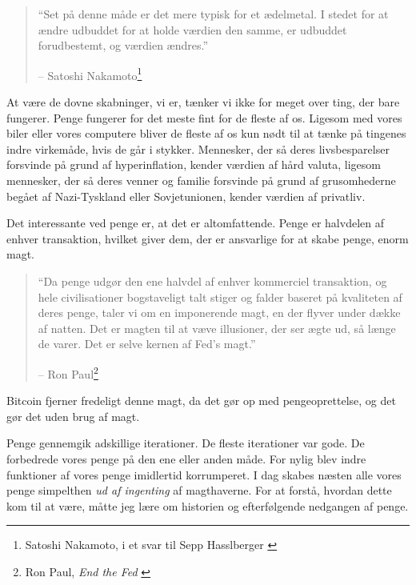 \begin{quotation}\begin{samepage}
\enquote{Set på denne måde er det mere typisk for et ædelmetal. I stedet for at ændre udbuddet for at holde værdien den samme, er udbuddet forudbestemt, og værdien ændres.}
\begin{flushright} -- Satoshi Nakamoto\footnote{Satoshi Nakamoto, i et svar til Sepp
Hasslberger \cite{satoshi-precious-metal}}
\end{flushright}\end{samepage}\end{quotation}

At være de dovne skabninger, vi er, tænker vi ikke for meget over ting, der bare fungerer. Penge fungerer for det meste fint for de fleste af os. Ligesom med vores biler eller vores computere bliver de fleste af os kun nødt til at tænke på tingenes indre virkemåde, hvis de går i stykker. Mennesker, der så deres livsbesparelser forsvinde på grund af hyperinflation, kender værdien af hård valuta, ligesom mennesker, der så deres venner og familie forsvinde på grund af grusomhederne begået af Nazi-Tyskland eller Sovjetunionen, kender værdien af privatliv.

Det interessante ved penge er, at det er altomfattende. Penge er halvdelen af enhver transaktion, hvilket giver dem, der er ansvarlige for at skabe penge, enorm magt.

\begin{quotation}\begin{samepage}
\enquote{Da penge udgør den ene halvdel af enhver kommerciel transaktion, og hele civilisationer bogstaveligt talt stiger og falder baseret på kvaliteten af deres penge, taler vi om en imponerende magt, en der flyver under dække af natten. Det er magten til at væve illusioner, der ser ægte ud, så længe de varer. Det er selve kernen af ​​Fed's magt.}
\begin{flushright} -- Ron Paul\footnote{Ron Paul, \textit{End the Fed} \cite{end-the-fed}}
\end{flushright}\end{samepage}\end{quotation}

Bitcoin fjerner fredeligt denne magt, da det gør op med pengeoprettelse, og det gør det uden brug af magt.

Penge gennemgik adskillige iterationer. De fleste iterationer var gode. De forbedrede vores penge på den ene eller anden måde. For nylig blev indre funktioner af vores penge imidlertid korrumperet. I dag skabes næsten alle vores penge simpelthen \textit{ud af ingenting} af magthaverne. For at forstå, hvordan dette kom til at være, måtte jeg lære om historien og efterfølgende nedgangen af ​​penge.


